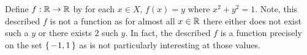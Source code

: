 \guard



\begin{exmp}
\label{exmp:nonWellDefinedFunction}
  Define $f:\mathbb{R}\to\mathbb{R}$ by for each $x\in X$, $f(x)=y$ where $x^2 + y^2 = 1$.
  Note, this described $f$ is not a function as for almost all $x\in\mathbb{R}$ there either does not exist such a $y$ or there exists $2$ such $y$.
  In fact, the described $f$ is a function precisely on the set $\left\{\,-1,1\,\right\}$ as is not particularly interesting at those values.
\end{exmp}
